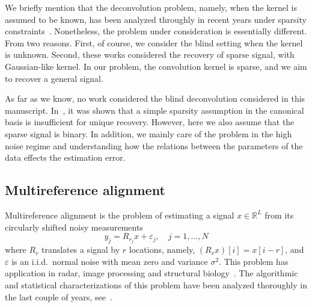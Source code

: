 \documentclass[journal]{IEEEtran}
\numberwithin{equation}{section}
\numberwithin{figure}{section}
\theoremstyle{plain}
\theoremstyle{definition}
\theoremstyle{remark}
\theoremstyle{plain}
\theoremstyle{remark}
\theoremstyle{plain}
\theoremstyle{plain}
\newcommand{\RL}{\mathbb{R}^L}
\begin{document}
We briefly mention that the deconvolution problem, namely, when the kernel is assumed to be known, has been analyzed throughly in recent years under sparsity constraints~\cite{bendory2016robust,bendory2017robust,bendory2016stable,boyer2017adapting,bernstein2017deconvolution,de2012exact,azais2015spike,duval2015exact,duval2015sparse}.  Nonetheless, the problem under consideration is essentially different. From two reasons. First, of course, we consider the blind setting when the kernel is unknown. Second, these works considered the recovery of sparse signal, with Gaussian-like kernel. In our problem, the convolution kernel is sparse, and we aim to recover a general signal. 

As far as we know, no work considered the blind deconvolution considered in this manuscript. In~\cite{choudhary2014sparse}, it  was shown that 
a simple sparsity assumption in the canonical basis is insufficient
for unique recovery. However, here we also assume that the sparse signal is binary. In addition, we mainly care of the problem in the high noise regime and understanding how the relations between the parameters of the data effects the estimation error. 


\subsection{Multireference alignment} \label{sec:mra}


Multireference alignment is the problem of estimating a signal $x\in\RL$ from its circularly shifted noisy measurements
\begin{equation} \label{eq:mra}
y_j = R_{r_j}x + \varepsilon_j, \quad j = 1,\ldots,N
\end{equation}
where $R_{r}$ translates a signal by $r$ locations, namely, $(R_rx)[i] = x[i-r]$, and $\varepsilon$ is an i.i.d.\ normal noise with mean zero and variance $\sigma^2$. This problem has application in radar, image processing and structural biology~\cite{zwart2003fast,foroosh2002extension,diamond1992multiple}. The algorithmic and statistical characterizations of this problem have been analyzed thoroughly in the last couple of years, see~\cite{bendory2017bispectrum,bandeira2014multireference,bandeira2017optimal,perry2017sample,boumal2017heterogeneous,abbe2017multireference,abbe2017sample}.
\end{document}
